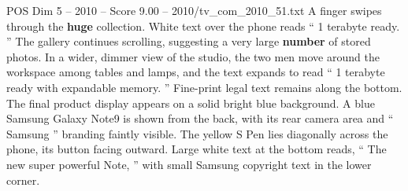 \begin{textsample}{POS Dim 5 – 2010 – Score 9.00 – 2010/tv\_com\_2010\_51.txt}
A finger swipes through the \textbf{huge} collection.
White text over the phone reads “ 1 terabyte ready. ” The gallery continues scrolling, suggesting a very large \textbf{number} of stored photos.
In a wider, dimmer view of the studio, the two men move around the workspace among tables and lamps, and the text expands to read “ 1 terabyte ready with expandable memory. ” Fine-print legal text remains along the bottom.
The final product display appears on a solid bright blue background.
A blue Samsung Galaxy Note9 is shown from the back, with its rear camera area and “ Samsung ” branding faintly visible.
The yellow S Pen lies diagonally across the phone, its button facing outward.
Large white text at the bottom reads, “ The new super powerful Note, ” with small Samsung copyright text in the lower corner.

\end{textsample}
